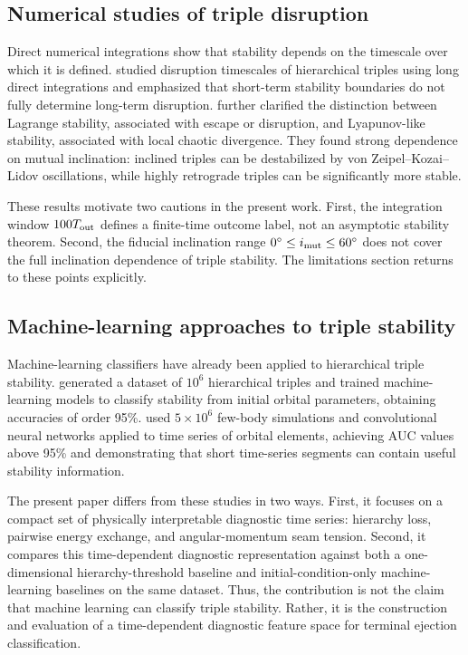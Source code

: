 \documentclass[12pt,a4paper]{article}
\newcommand{\Tout}{T_{\rm out}}
\begin{document}
\subsection{Numerical studies of triple disruption}
\label{sec:related_numerical}

Direct numerical integrations show that stability depends on the timescale over which it is defined. \citet{Hayashi2022} studied disruption timescales of hierarchical triples using long direct integrations and emphasized that short-term stability boundaries do not fully determine long-term disruption. \citet{Hayashi2023} further clarified the distinction between Lagrange stability, associated with escape or disruption, and Lyapunov-like stability, associated with local chaotic divergence. They found strong dependence on mutual inclination: inclined triples can be destabilized by von Zeipel--Kozai--Lidov oscillations, while highly retrograde triples can be significantly more stable.

These results motivate two cautions in the present work. First, the integration window \(100\Tout\) defines a finite-time outcome label, not an asymptotic stability theorem. Second, the fiducial inclination range \(0^\circ\leq i_{\rm mut}\leq60^\circ\) does not cover the full inclination dependence of triple stability. The limitations section returns to these points explicitly.

\subsection{Machine-learning approaches to triple stability}
\label{sec:related_ml}

Machine-learning classifiers have already been applied to hierarchical triple stability. \citet{Vynatheya2022} generated a dataset of \(10^6\) hierarchical triples and trained machine-learning models to classify stability from initial orbital parameters, obtaining accuracies of order 95\%. \citet{LalandeTrani2022} used \(5\times10^6\) few-body simulations and convolutional neural networks applied to time series of orbital elements, achieving AUC values above 95\% and demonstrating that short time-series segments can contain useful stability information.

The present paper differs from these studies in two ways. First, it focuses on a compact set of physically interpretable diagnostic time series: hierarchy loss, pairwise energy exchange, and angular-momentum seam tension. Second, it compares this time-dependent diagnostic representation against both a one-dimensional hierarchy-threshold baseline and initial-condition-only machine-learning baselines on the same dataset. Thus, the contribution is not the claim that machine learning can classify triple stability. Rather, it is the construction and evaluation of a time-dependent diagnostic feature space for terminal ejection classification.
\end{document}
